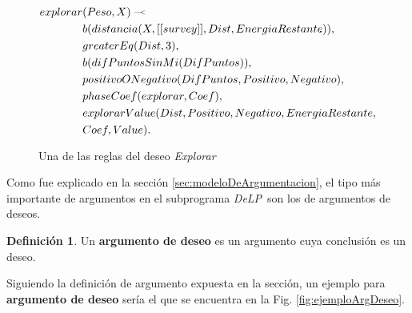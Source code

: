 \documentclass[oneside]{book}
\theoremstyle{definition}
\newtheorem{definicion}{Definición}[section]
\newcommand{\DLP}{\mbox{\textit{DeLP}}}
\newcommand{\drule}[2]{\mbox{$ #1\; \defleftarrow \; #2$}}
\newcommand{\defleftarrow}{{\raise1.5pt\hbox{\tiny\defleft}}}
\newcommand{\defleft}{\mbox{---\hspace{-1.5pt}\raise.05pt\hbox{$<$}}}
\newcommand{\bigAS}[2]{$\bigl\langle \{#1\}, #2 \bigr\rangle $}
\newcommand{\nlA}[1]{$$\mbox{#1}$$}
\begin{document}
\begin{figure}
\begin{equation*}
\begin{aligned}
explorar&(Peso, X)\; \defleftarrow \;\\
	&b(distancia(X, [[survey]], Dist, EnergiaRestante)),\\
    &greaterEq(Dist, 3),\\
    &b(difPuntosSinMi(DifPuntos)),\\
    &positivoONegativo(DifPuntos, Positivo, Negativo),\\
    &phaseCoef(explorar, Coef),\\
    &explorarValue(Dist, Positivo, Negativo, EnergiaRestante, \\
    &Coef, Value).
\end{aligned}
\end{equation*}
\caption{Una de las reglas del deseo \emph{Explorar}}
\label{fig:deseoExplorar}
\end{figure}

Como fue explicado en la sección \ref{sec:modeloDeArgumentacion}, el tipo más importante de 
argumentos en el subprograma \DLP\ son los de argumentos de deseos. 

\begin{definicion}
	Un \textbf{argumento de deseo} es un argumento cuya conclusión es un deseo.
\end{definicion}

Siguiendo la definición de argumento expuesta en la sección, un ejemplo para
\textbf{argumento de deseo} sería el que se encuentra en la Fig. 
\ref{fig:ejemploArgDeseo}.

\end{document}
